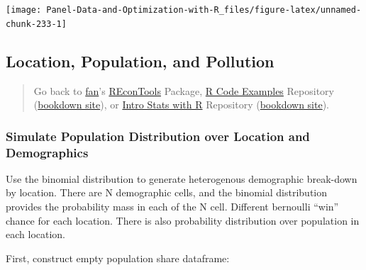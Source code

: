 \documentclass[
]{book}
\begin{document}
\begin{center}\texttt{[image: Panel-Data-and-Optimization-with-R\_files/figure-latex/unnamed-chunk-233-1]} \end{center}

\hypertarget{location-population-and-pollution}{%
\subsection{Location, Population, and Pollution}\label{location-population-and-pollution}}

\begin{quote}
Go back to \href{http://fanwangecon.github.io/}{fan}'s \href{https://fanwangecon.github.io/REconTools/}{REconTools} Package, \href{https://fanwangecon.github.io/R4Econ/}{R Code Examples} Repository (\href{https://fanwangecon.github.io/R4Econ/bookdown}{bookdown site}), or \href{https://fanwangecon.github.io/Stat4Econ/}{Intro Stats with R} Repository (\href{https://fanwangecon.github.io/Stat4Econ/bookdown}{bookdown site}).
\end{quote}

\hypertarget{simulate-population-distribution-over-location-and-demographics}{%
\subsubsection{Simulate Population Distribution over Location and Demographics}\label{simulate-population-distribution-over-location-and-demographics}}

Use the binomial distribution to generate heterogenous demographic break-down by location. There are N demographic cells, and the binomial distribution provides the probability mass in each of the N cell. Different bernoulli ``win'' chance for each location. There is also probability distribution over population in each location.

First, construct empty population share dataframe:
\end{document}
